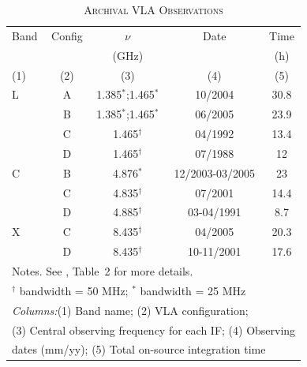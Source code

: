 \documentclass[fleqn,usenatbib]{mnras}
\def\tab{Table}
\begin{document}
\begin{center}
\begin{table}\footnotesize
\caption{\textsc{Archival VLA Observations}}
\label{tab:vlaObs}
\hfill{}
\tabcolsep=0.11cm
\begin{tabular}{lcccc}
\hline\hline
\noalign{\smallskip}
Band & Config & $\nu$ &    Date     & Time \\ 
     &               & (GHz) &   & (h) \\ 
(1)  &      (2)      & (3)   &   (4)       &  (5)   \\ 
 \hline 
L & A & 1.385$^{*}$;1.465$^{*}$ & 10/2004 & 30.8 \\
  & B & 1.385$^{*}$;1.465$^{*}$ & 06/2005   & 23.9 \\
  & C & 1.465$^{\dagger}$ & 04/1992  & 13.4 \\
  & D & 1.465$^{\dagger}$ & 07/1988 & 12 \\
\hline
C & B & 4.876$^{*}$ & 12/2003-03/2005 & 23 \\
  & C & 4.835$^{\dagger}$ & 07/2001 & 14.4 \\
  & D & 4.885$^{\dagger}$ & 03-04/1991 & 8.7 \\
\hline
X & C & 8.435$^{\dagger}$ & 04/2005 & 20.3 \\
  & D & 8.435$^{\dagger}$ & 10-11/2001 & 17.6 \\
\hline
\hline
\multicolumn{5}{l}{{Notes.} See \citealt{Dumasetal2011}, \tab~2 for more details. }\\
\multicolumn{5}{l}{$^{\dagger}$ bandwidth = 50 MHz; $^{*}$ bandwidth = 25 MHz }\\
\multicolumn{5}{l}{\textit{Columns:}(1) Band name; (2) VLA configuration; }\\
\multicolumn{5}{l}{(3) Central observing frequency for each IF; (4) Observing}\\
\multicolumn{5}{l}{dates (mm/yy); (5) Total on-source integration time}

\end{tabular}
\hfill{}
\end{table}
\end{center}
\end{document}
